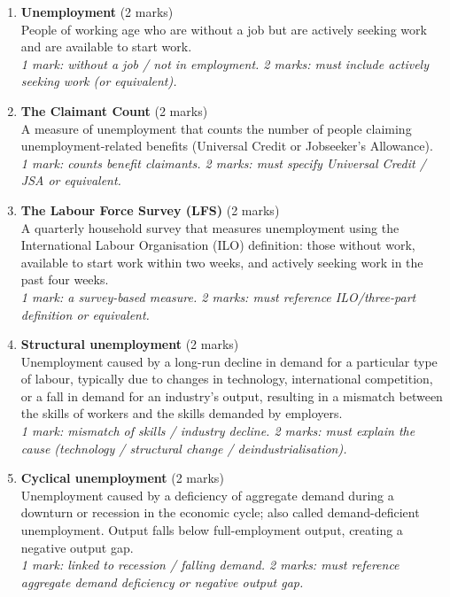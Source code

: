 \documentclass[12pt,a4paper]{article}
\begin{document}
\begin{enumerate}[leftmargin=*, label=\textbf{\arabic*.}]

    \item \textbf{Unemployment} \hfill (2 marks)\\
    People of working age who are without a job but are actively seeking work and are available to start work. \\
    \textit{1 mark: without a job / not in employment. 2 marks: must include actively seeking work (or equivalent).}

    \vspace{0.5em}

    \item \textbf{The Claimant Count} \hfill (2 marks)\\
    A measure of unemployment that counts the number of people claiming unemployment-related benefits (Universal Credit or Jobseeker's Allowance).\\
    \textit{1 mark: counts benefit claimants. 2 marks: must specify Universal Credit / JSA or equivalent.}

    \vspace{0.5em}

    \item \textbf{The Labour Force Survey (LFS)} \hfill (2 marks)\\
    A quarterly household survey that measures unemployment using the International Labour Organisation (ILO) definition: those without work, available to start work within two weeks, and actively seeking work in the past four weeks.\\
    \textit{1 mark: a survey-based measure. 2 marks: must reference ILO/three-part definition or equivalent.}

    \vspace{0.5em}

    \item \textbf{Structural unemployment} \hfill (2 marks)\\
    Unemployment caused by a long-run decline in demand for a particular type of labour, typically due to changes in technology, international competition, or a fall in demand for an industry's output, resulting in a mismatch between the skills of workers and the skills demanded by employers.\\
    \textit{1 mark: mismatch of skills / industry decline. 2 marks: must explain the cause (technology / structural change / deindustrialisation).}

    \vspace{0.5em}

    \item \textbf{Cyclical unemployment} \hfill (2 marks)\\
    Unemployment caused by a deficiency of aggregate demand during a downturn or recession in the economic cycle; also called demand-deficient unemployment. Output falls below full-employment output, creating a negative output gap.\\
    \textit{1 mark: linked to recession / falling demand. 2 marks: must reference aggregate demand deficiency or negative output gap.}

\end{enumerate}
\end{document}
